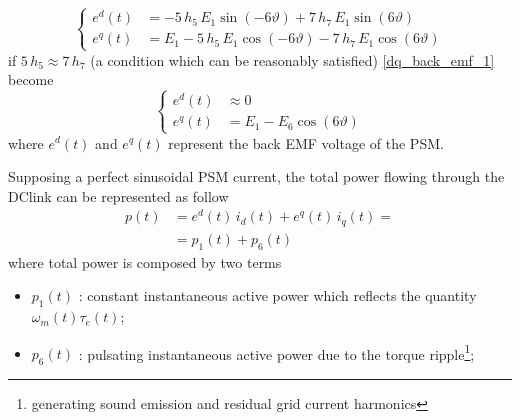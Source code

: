 \documentclass[12pt,a4paper]{scrartcl}
\begin{document}
\begin{onehalfspace}
\begin{equation}
	\left\lbrace 
	\begin{aligned}
		e^{d}(t) & = -5\,h_5\,E_1\sin\left( -6\vartheta \right) + 7\,h_7\,E_1\sin\left(6\vartheta \right)\\[6pt]
		e^{q}(t) & = E_1 - 5\,h_5\,E_1\cos\left(-6\vartheta\right) - 7\,h_7\,E_1\cos\left(6\vartheta\right)
	\end{aligned}
	\right. 
\end{equation}
if $5\,h_5\approx7\,h_7$ (a condition which can be reasonably satisfied) \eqref{dq_back_emf_1} become
\begin{equation}\label{dq_back_emf_2}
	\left\lbrace 
	\begin{aligned}
		e^{d}(t) & \approx 0 \\[6pt]
		e^{q}(t) & = E_1 - E_6 \cos\left(6\vartheta\right)
	\end{aligned}
	\right. 
\end{equation}
where $e^{d}(t)$ and $e^{q}(t)$ represent the back EMF voltage of the PSM.

Supposing a perfect sinusoidal PSM current, the total power flowing through the DClink can be represented as follow
\begin{equation}
		\begin{aligned}
	p(t) &= e^{d}(t)\,i_d(t) + e^{q}(t)\,i_q(t) = \\[6pt]
		 &= p_1(t) + p_6(t)
		\end{aligned}
\end{equation}
where total power is composed by two terms
\begin{itemize}
	\item[--] $p_1(t)$ : constant instantaneous active power which reflects the quantity $\omega_m(t)\tau_e(t)$;  
	\item[--] $p_6(t)$ : pulsating instantaneous active power due to the torque ripple\footnote{generating sound emission and residual grid current harmonics};  
\end{itemize}


\end{onehalfspace}
\end{document}
